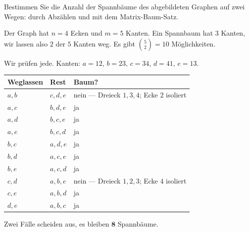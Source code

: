 \begin{aufgabe}
Bestimmen Sie die Anzahl der Spannbäume des abgebildeten Graphen auf zwei Wegen: durch Abzählen und mit dem Matrix-Baum-Satz.

\begin{center}
\end{center}

\loesung
{}
Der Graph hat $n = 4$ Ecken und $m = 5$ Kanten. Ein Spannbaum hat $3$ Kanten, wir lassen also $2$ der $5$ Kanten weg. Es gibt $\binom{5}{2} = 10$ Möglichkeiten.

Wir prüfen jede. Kanten: $a = 12$, $b = 23$, $c = 34$, $d = 41$, $e = 13$.

\begin{center}
{\small
\renewcommand{\arraystretch}{1.32}
\begin{tabular}{@{}P{1.8cm}P{2.4cm}P{3.0cm}@{}}
\toprule
\textbf{Weglassen} & \textbf{Rest} & \textbf{Baum?}\\
\midrule
$a,b$ & $c,d,e$ & \textcolor{akzent}{nein} --- Dreieck $1,3,4$; Ecke $2$ isoliert\\
$a,c$ & $b,d,e$ & \textcolor{gruen}{ja}\\
$a,d$ & $b,c,e$ & \textcolor{gruen}{ja}\\
$a,e$ & $b,c,d$ & \textcolor{gruen}{ja}\\
$b,c$ & $a,d,e$ & \textcolor{gruen}{ja}\\
$b,d$ & $a,c,e$ & \textcolor{gruen}{ja}\\
$b,e$ & $a,c,d$ & \textcolor{gruen}{ja}\\
$c,d$ & $a,b,e$ & \textcolor{akzent}{nein} --- Dreieck $1,2,3$; Ecke $4$ isoliert\\
$c,e$ & $a,b,d$ & \textcolor{gruen}{ja}\\
$d,e$ & $a,b,c$ & \textcolor{gruen}{ja}\\
\bottomrule
\end{tabular}}
\end{center}

Zwei Fälle scheiden aus, es bleiben $\mathbf{8}$ Spannbäume.


\end{aufgabe}
